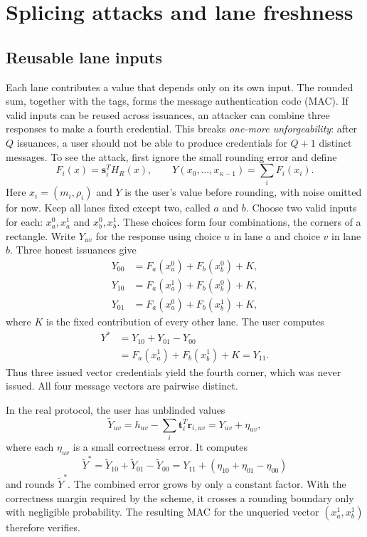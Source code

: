\documentclass[10pt]{article}
\begin{document}
\section{Splicing attacks and lane freshness}\label{sec:rectangle}

\subsection{Reusable lane inputs}

Each lane contributes a value that depends only on its own input.  The rounded
sum, together with the tags, forms the message authentication code (MAC).
If valid inputs can be reused across issuances, an attacker
can combine three responses to make a fourth credential.  This breaks
\emph{one-more unforgeability}: after $Q$ issuances, a user should not be
able to produce credentials for $Q+1$ distinct messages.  To see the attack,
first ignore the small rounding error and define
\[
 F_i(x)=\mathbf s_i^T H_R(x),\qquad
 Y(x_0,\ldots,x_{\kappa-1})=\sum_i F_i(x_i).
\]
Here $x_i=(m_i,\rho_i)$ and $Y$ is the user's value before rounding, with
noise omitted for now.  Keep all lanes fixed except two, called $a$ and $b$.
Choose two valid inputs for each: $x_a^0,x_a^1$ and $x_b^0,x_b^1$.  These
choices form four combinations, the corners of a rectangle.  Write $Y_{uv}$
for the response using choice $u$ in lane $a$ and choice $v$ in lane $b$.
Three honest issuances give
\begin{align*}
 Y_{00}&=F_a(x_a^0)+F_b(x_b^0)+K,\\
 Y_{10}&=F_a(x_a^1)+F_b(x_b^0)+K,\\
 Y_{01}&=F_a(x_a^0)+F_b(x_b^1)+K,
\end{align*}
where $K$ is the fixed contribution of every other lane.  The user computes
\begin{align*}
 Y^*&=Y_{10}+Y_{01}-Y_{00}\\
 &=F_a(x_a^1)+F_b(x_b^1)+K=Y_{11}.
\end{align*}
Thus three issued vector credentials yield the fourth corner, which was never
issued.  All four message vectors are pairwise distinct.

In the real protocol, the user has unblinded values
\[
 \widetilde Y_{uv}=h_{uv}-\sum_i\mathbf t_i^T\mathbf r_{i,uv}
                  =Y_{uv}+\eta_{uv},
\]
where each $\eta_{uv}$ is a small correctness error.  It computes
\[
 \widetilde Y^*=\widetilde Y_{10}+\widetilde Y_{01}-\widetilde Y_{00}
 =Y_{11}+(\eta_{10}+\eta_{01}-\eta_{00})
\]
and rounds $\widetilde Y^*$.  The combined error grows by only a constant
factor.  With the correctness margin required by the scheme, it crosses a
rounding boundary only with negligible probability.  The resulting MAC for
the unqueried vector $(x_a^1,x_b^1)$ therefore verifies.
\end{document}
